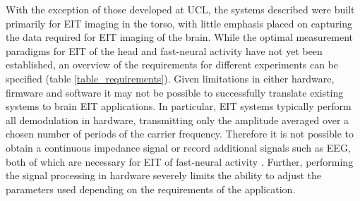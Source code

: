 With the exception of those developed at UCL, the systems described were built primarily for EIT imaging in the torso, with little emphasis placed on capturing the data required for EIT imaging of the brain. While the optimal measurement paradigms for EIT of the head and fast-neural activity have not yet been established, an overview of the requirements for different experiments can be specified (table \ref{table_requirements}). Given limitations in either hardware, firmware and software it may not be possible to successfully translate existing systems to brain EIT applications. In particular, EIT systems typically perform all demodulation in hardware, transmitting only the amplitude averaged over a chosen number of periods of the carrier frequency. Therefore it is not possible to obtain a continuous impedance signal or record additional signals such as EEG, both of which are necessary for EIT of fast-neural activity \cite{Aristovich_2016}. Further, performing the signal processing in hardware severely limits the ability to adjust the parameters used depending on the requirements of the application.